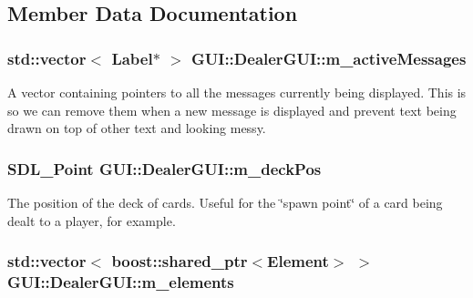 \subsection{Member Data Documentation}
\hypertarget{classGUI_1_1DealerGUI_a9f528201ce3d04aba77c56a6370815dd}{
\subsubsection[{m\-\_\-active\-Messages}]{\setlength{\rightskip}{0pt plus 5cm}std\-::vector$<$ {\bf Label}$\ast$ $>$ G\-U\-I\-::\-Dealer\-G\-U\-I\-::m\-\_\-active\-Messages\hspace{0.3cm}{\ttfamily [private]}}}\label{classGUI_1_1DealerGUI_a9f528201ce3d04aba77c56a6370815dd}


A vector containing pointers to all the messages currently being displayed. This is so we can remove them when a new message is displayed and prevent text being drawn on top of other text and looking messy. 

\hypertarget{classGUI_1_1DealerGUI_ab7cd52bf63f7eca7d1726e11e1b8100e}{
\subsubsection[{m\-\_\-deck\-Pos}]{\setlength{\rightskip}{0pt plus 5cm}S\-D\-L\-\_\-\-Point G\-U\-I\-::\-Dealer\-G\-U\-I\-::m\-\_\-deck\-Pos\hspace{0.3cm}{\ttfamily [private]}}}\label{classGUI_1_1DealerGUI_ab7cd52bf63f7eca7d1726e11e1b8100e}


The position of the deck of cards. Useful for the \char`\"{}spawn point\char`\"{} of a card being dealt to a player, for example. 

\hypertarget{classGUI_1_1DealerGUI_a6985ea1998d7070d905953d7032701a8}{
\subsubsection[{m\-\_\-elements}]{\setlength{\rightskip}{0pt plus 5cm}std\-::vector$<$ boost\-::shared\-\_\-ptr$<${\bf Element}$>$ $>$ G\-U\-I\-::\-Dealer\-G\-U\-I\-::m\-\_\-elements\hspace{0.3cm}{\ttfamily [private]}}}\label{classGUI_1_1DealerGUI_a6985ea1998d7070d905953d7032701a8}


